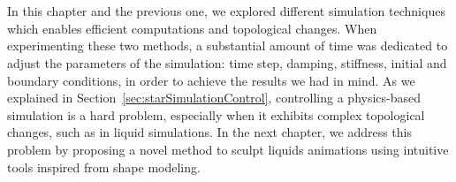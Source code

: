 \\
\\
In this chapter and the previous one, we explored different simulation techniques which enables efficient computations and topological changes. 
When experimenting these two methods, a substantial amount of time was dedicated to adjust the parameters of the simulation: time step, damping, stiffness, initial and boundary conditions, in order to achieve the results we had in mind.
As we explained in Section~\ref{sec:starSimulationControl}, controlling a physics-based simulation is a hard problem, especially when it exhibits complex topological changes, such as in liquid simulations.
In the next chapter, we address this problem by proposing a novel method to sculpt liquids animations using intuitive tools inspired from shape modeling.
